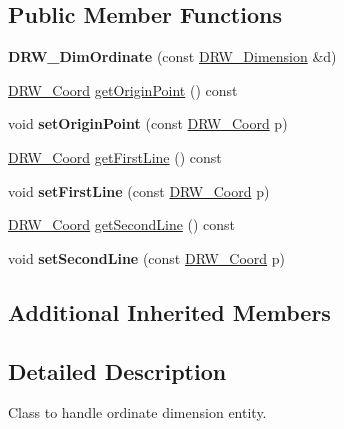 \subsection*{Public Member Functions}
\begin{DoxyCompactItemize}
\item 
\hypertarget{classDRW__DimOrdinate_ac430d9bc000d98a671ab8f50e0a2fec9}{{\bfseries D\-R\-W\-\_\-\-Dim\-Ordinate} (const \hyperlink{classDRW__Dimension}{D\-R\-W\-\_\-\-Dimension} \&d)}\label{classDRW__DimOrdinate_ac430d9bc000d98a671ab8f50e0a2fec9}

\item 
\hyperlink{classDRW__Coord}{D\-R\-W\-\_\-\-Coord} \hyperlink{classDRW__DimOrdinate_a8edf6d0926e228257425da4dc76b0b46}{get\-Origin\-Point} () const 
\item 
\hypertarget{classDRW__DimOrdinate_ab573489b23ea20ef1d9f65e6fe8215f1}{void {\bfseries set\-Origin\-Point} (const \hyperlink{classDRW__Coord}{D\-R\-W\-\_\-\-Coord} p)}\label{classDRW__DimOrdinate_ab573489b23ea20ef1d9f65e6fe8215f1}

\item 
\hyperlink{classDRW__Coord}{D\-R\-W\-\_\-\-Coord} \hyperlink{classDRW__DimOrdinate_a4effa3ec976e12b2cf7ade6caced2cfb}{get\-First\-Line} () const 
\item 
\hypertarget{classDRW__DimOrdinate_aebd3d6021d26a48f45dcd552c24d2220}{void {\bfseries set\-First\-Line} (const \hyperlink{classDRW__Coord}{D\-R\-W\-\_\-\-Coord} p)}\label{classDRW__DimOrdinate_aebd3d6021d26a48f45dcd552c24d2220}

\item 
\hyperlink{classDRW__Coord}{D\-R\-W\-\_\-\-Coord} \hyperlink{classDRW__DimOrdinate_afff3c4532e4d7bccf97867b96dc36491}{get\-Second\-Line} () const 
\item 
\hypertarget{classDRW__DimOrdinate_a8d04c6d76fbe8bef25d47305d9e47a24}{void {\bfseries set\-Second\-Line} (const \hyperlink{classDRW__Coord}{D\-R\-W\-\_\-\-Coord} p)}\label{classDRW__DimOrdinate_a8d04c6d76fbe8bef25d47305d9e47a24}

\end{DoxyCompactItemize}
\subsection*{Additional Inherited Members}


\subsection{Detailed Description}
Class to handle ordinate dimension entity. 

